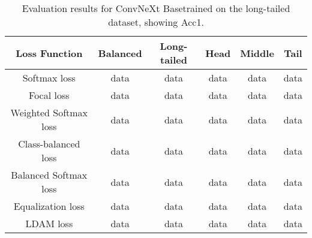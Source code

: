 \begin{table}[h!]
    \centering
    \begin{tabular}{cccccc}
        \toprule
        Loss Function & Balanced & Long-tailed & Head & Middle & Tail \\ 
        \midrule
        Softmax loss   & data & data & data & data & data \\
        Focal loss   & data & data & data & data & data \\
        Weighted Softmax loss   & data & data & data & data & data \\
        Class-balanced loss   & data & data & data & data & data \\
        Balanced Softmax loss   & data & data & data & data & data \\
        Equalization loss   & data & data & data & data & data \\
        LDAM loss   & data & data & data & data & data \\
        \bottomrule
    \end{tabular}
    \caption{Evaluation results for ConvNeXt Basetrained on the long-tailed dataset, showing Acc1.}
    \label{tab:conv_lt_acc1}
\end{table}


